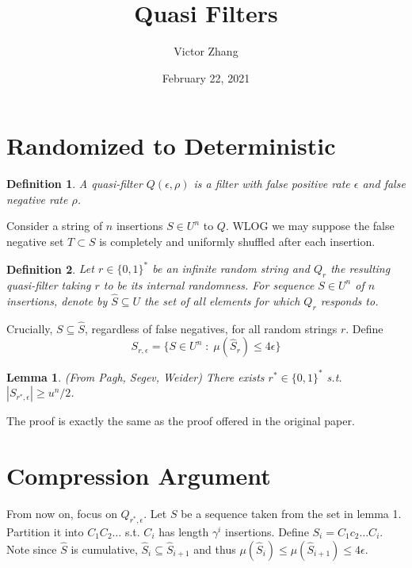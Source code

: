 \documentclass{article}
\title{Quasi Filters}
\author{Victor Zhang}
\date{February 22, 2021}
\newtheorem{definition}{Definition}
\newtheorem{lemma}{Lemma}
\begin{document}
\maketitle

\section{Randomized to Deterministic}

\begin{definition}
A \textit{quasi-filter} $Q(\epsilon,\rho)$ is a filter with false positive rate $\epsilon$ and false negative rate $\rho$.
\end{definition}
Consider a string of $n$ insertions $S \in U^n$ to $Q$. WLOG we may suppose the false negative set $T \subset S$ is completely and uniformly shuffled after each insertion.
\begin{definition}
Let $r \in \{0,1\}^*$ be an infinite random string and $Q_r$ the resulting quasi-filter taking $r$ to be its internal randomness. For sequence $S \in U^n$ of $n$ insertions, denote by $\hat{S} \subseteq U$ the set of all elements for which $Q_r$ responds  to.
\end{definition}
Crucially, $S \subseteq \hat{S}$, regardless of false negatives, for all random strings $r$. Define
$$S_{r,\epsilon} = \{S \in U^n \;:\; \mu(\hat{S}_r) \leq 4\epsilon \}$$

\begin{lemma}
(From Pagh, Segev, Weider) There exists $r^* \in \{0,1\}^*$ s.t. $|S_{r^*,\epsilon}| \geqslant u^n/2$.
\end{lemma}
The proof is exactly the same as the proof offered in the original paper.

\section{Compression Argument}
From now on, focus on $Q_{r^*,\epsilon}$. Let $S$ be a sequence taken from the set in lemma 1. Partition it into $C_1C_2\dots$ s.t. $C_i$ has length $\gamma^i$ insertions. Define $S_i = C_1c_2\dots C_i$. Note since $\hat{S}$ is cumulative, $\hat{S}_i \subseteq \hat{S}_{i+1}$ and thus $\mu(\hat{S}_i) \leqslant \mu(\hat{S}_{i+1}) \leqslant 4\epsilon$.
\end{document}
